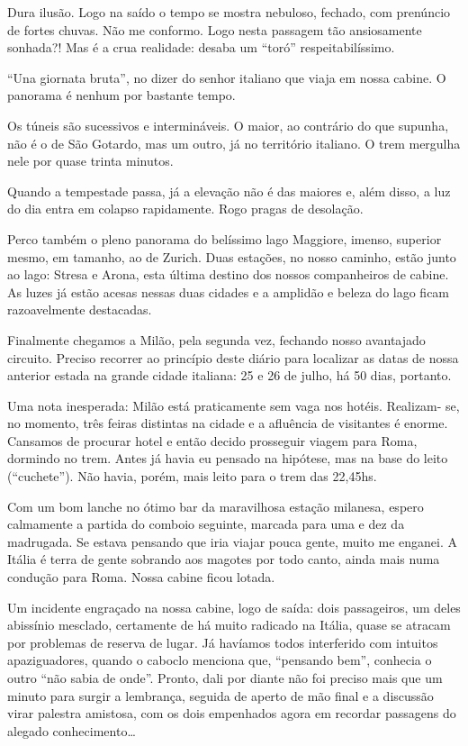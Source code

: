 Dura ilusão. Logo na saído o tempo se mostra nebuloso, fechado, com prenúncio de fortes chuvas. Não me conformo. Logo nesta passagem tão ansiosamente sonhada?! Mas é a crua realidade: desaba um “toró” respeitabilíssimo.

“Una giornata bruta”, no dizer do senhor italiano que viaja em nossa cabine. O panorama é nenhum por bastante tempo.

Os túneis são sucessivos e intermináveis. O maior, ao contrário do que supunha, não é o de São Gotardo, mas um outro, já no território italiano. O trem mergulha nele por quase trinta minutos.

Quando a tempestade passa, já a elevação não é das maiores e, além disso, a luz do dia entra em colapso rapidamente. Rogo pragas de desolação.

Perco também o pleno panorama do belíssimo lago Maggiore, imenso, superior mesmo, em tamanho, ao de Zurich. Duas estações, no nosso caminho, estão junto ao lago: Stresa e Arona, esta última destino dos nossos companheiros de cabine. As luzes já estão acesas nessas duas cidades e a amplidão e beleza do lago ficam razoavelmente destacadas.

Finalmente chegamos a Milão, pela segunda vez, fechando nosso avantajado circuito. Preciso recorrer ao princípio deste diário para localizar as datas de nossa anterior estada na grande cidade italiana: 25 e 26 de julho, há 50 dias, portanto.

Uma nota inesperada: Milão está praticamente sem vaga nos hotéis. Realizam- se, no momento, três feiras distintas na cidade e a afluência de visitantes é enorme. Cansamos de procurar hotel e então decido prosseguir viagem para Roma, dormindo no trem. Antes já havia eu pensado na hipótese, mas na base do leito (“cuchete”). Não havia, porém, mais leito para o trem das 22,45hs.

Com um bom lanche no ótimo bar da maravilhosa estação milanesa, espero calmamente a partida do comboio seguinte, marcada para uma e dez da madrugada. Se estava pensando que iria viajar pouca gente, muito me enganei. A Itália é terra de gente sobrando aos magotes por todo canto, ainda mais numa condução para Roma. Nossa cabine ficou lotada.

Um incidente engraçado na nossa cabine, logo de saída: dois passageiros, um deles abissínio mesclado, certamente de há muito radicado na Itália, quase se atracam por problemas de reserva de lugar. Já havíamos todos interferido com intuitos apaziguadores, quando o caboclo menciona que, “pensando bem”, conhecia o outro “não sabia de onde”. Pronto, dali por diante não foi preciso mais que um minuto para surgir a lembrança, seguida de aperto de mão final e a discussão virar palestra amistosa, com os dois empenhados agora em recordar passagens do alegado conhecimento\ldots

